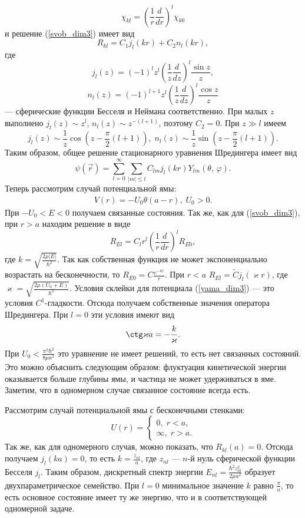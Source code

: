 \documentclass[a4paper
]{article}
\begin{document}
$$\chi_{kl}=\left(\frac{1}{r}\frac{d}{dr}\right)^l\chi_{k0}$$ и решение
(\ref{svob_dim3}) имеет вид $$R_{kl}=C_1j_l(kr)+C_2n_l(kr),$$ где
$$j_l(z)=(-1)^lz^l\left(\frac{1}{z}\frac{d}{dz}\right)^l\frac{\sin z}{z},$$
$$n_l(z)=(-1)^{l+1}z^l\left(\frac{1}{z}\frac{d}{dz}\right)^l\frac{\cos z}
{z}$$ --- сферические функции Бесселя и Неймана соответственно. При
малых $z$ выполнено $j_l(z)\sim z^l$, $n_l(z)\sim z^{-(l+1)}$, поэтому $C_2=0$.
При $z\gg l$ имеем $$j_l(z)\sim \frac{1}{z}\cos \left(z-\frac{\pi}{2}
(l+1)\right), \; n_l(z)\sim \frac{1}{z}\sin \left(z-\frac{\pi}{2}(l+1)
\right).$$ Таким образом, общее решение стационарного уравнения Шредингера
имеет вид $$\psi(\vec r)=\sum \limits_{l=0}^\infty \sum \limits_{|m|
\le l}C_{lm}j_l(kr)Y_{lm}(\theta, \, \varphi).$$ Теперь рассмотрим случай
потенциальной ямы:
\begin{align}
\label{yama_dim3}
V(r)=-U_0\theta(a-r), \; U_0>0.
\end{align}
При $-U_0<E<0$ получаем
связанные состояния. Так же, как для (\ref{svob_dim3}), при $r>a$
находим решение в виде $$R_{El}=C_lr^l\left(\frac{1}{r}\frac{d}{dr}\right)^l
R_{E0},$$ где $k=\sqrt{\frac{2\mu|E|}{\hbar^2}}$. Так как собственная
функция не может экспоненциально возрастать на бесконечности, то $R_{E0}=
C\frac{e^{-kr}}{r}$. При $r<a$ $R_{El}=\tilde Cj_l(\varkappa r)$, где
$\varkappa=\sqrt{\frac{2\mu(U_0+E)}{\hbar^2}}$. Условия склейки для
потенциала (\ref{yama_dim3}) --- это условия $C^1$-гладкости. Отсюда
получаем собственные значения оператора Шредингера. При $l=0$ эти
условия имеют вид $$\ctg \varkappa a=-\frac{k}{\varkappa}.$$ При $U_0<
\frac{\pi^2\hbar^2}{8\mu a^2}$ это уравнение не имеет решений, то есть
нет связанных состояний. Это можно объяснить следующим образом: флуктуация
кинетической энергии оказывается больше глубины ямы, и частица не может
удерживаться в яме. Заметим, что в одномерном случае связанное состояние
всегда есть. \par
Рассмотрим случай потенциальной ямы с бесконечными стенками:
$$U(r)=\left\{\begin{array}{l}0, \; r<a, \\ \infty, \; r>a.\end{array}\right.$$
Так же, как для одномерного случая, можно показать, что $R_{kl}(a)=0$.
Отсюда получаем $j_l(ka)=0$, то есть $k=\frac{z_{nl}}{a}$, где $z_{nl}$ ---
$n$-й нуль сферической функции Бесселя $j_l$. Таким образом, дискретный спектр
энергии $E_{nl}=\frac{\hbar^2z^2_{nl}}{2\mu a^2}$ образует двухпараметрическое
семейство. При $l=0$ минимальное значение $k$ равно $\frac{\pi}{a}$, то
есть основное состояние имеет ту же энергию, что и в соответствующей
одномерной задаче.
\end{document}
